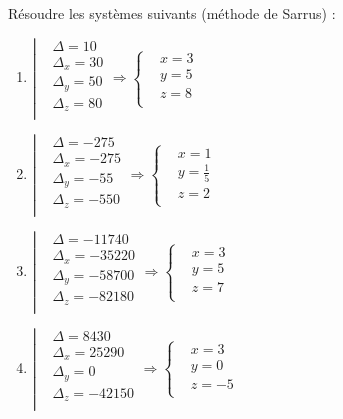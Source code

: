 \begin{solution}
Résoudre les systèmes suivants (méthode de Sarrus) :
\begin{multicols}{3}
\begin{enumerate}
\item $\left| \begin{array}{ll}
  & \Delta =10 \\ 
 & {{\Delta }_{x}}=30 \\ 
 & {{\Delta }_{y}}=50 \\ 
 & {{\Delta }_{z}}=80 \\ 
\end{array} \right.\Rightarrow \left\{ \begin{array}{ll}
  & x=3 \\ 
 & y=5 \\ 
 & z=8 \\ 
\end{array} \right.$
\item $\left| \begin{array}{ll}
  & \Delta =-275 \\ 
 & {{\Delta }_{x}}=-275 \\ 
 & {{\Delta }_{y}}=-55 \\ 
 & {{\Delta }_{z}}=-550 \\ 
\end{array} \right.\Rightarrow \left\{ \begin{array}{ll}
  & x=1 \\ 
 & y=\frac{1}{5} \\ 
 & z=2 \\ 
\end{array} \right.$
\item $\left| \begin{array}{ll}
  & \Delta =-11740 \\ 
 & {{\Delta }_{x}}=-35220 \\ 
 & {{\Delta }_{y}}=-58700 \\ 
 & {{\Delta }_{z}}=-82180 \\ 
\end{array} \right.\Rightarrow \left\{ \begin{array}{ll}
  & x=3 \\ 
 & y=5 \\ 
 & z=7 \\ 
\end{array} \right.$
\item $\left| \begin{array}{ll}
  & \Delta =8430 \\ 
 & {{\Delta }_{x}}=25290 \\ 
 & {{\Delta }_{y}}=0 \\ 
 & {{\Delta }_{z}}=-42150 \\ 
\end{array} \right.\Rightarrow \left\{ \begin{array}{ll}
  & x=3 \\ 
 & y=0 \\ 
 & z=-5 \\ 
\end{array} \right.$
\end{enumerate}
\end{multicols}
\end{solution}

